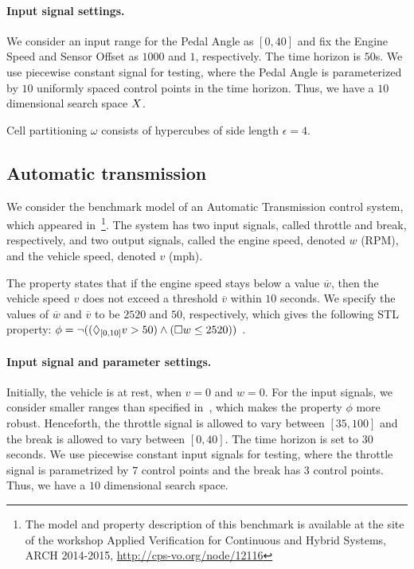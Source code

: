 \paragraph{Input signal settings.}
We consider an input range for
the Pedal Angle as $[0,40]$ and fix the Engine Speed and
Sensor Offset as $1000$ and $1$, respectively. The time horizon is $50$s.  We use piecewise constant
signal for testing, where the Pedal Angle is parameterized by $10$
uniformly spaced control points in the time horizon.  Thus, we
have a $10$ dimensional search space $X$.%



Cell partitioning $\omega$
consists of hypercubes of side length $\epsilon=4$. 


\subsection{Automatic transmission} \label{sec:autotrans}
We consider the benchmark model of an Automatic Transmission control
system, which appeared in~\cite{DBLP:conf/cpsweek/HoxhaAF14}\footnote{The model
and property description of this benchmark is available at the site of
the workshop Applied Verification for Continuous and Hybrid Systems,
ARCH 2014-2015, \url{http://cps-vo.org/node/12116}}.  The system has
two input signals, called throttle and break, respectively, and two
output signals, called the engine speed, denoted $w$ (RPM), and the vehicle
speed, denoted $v$ (mph).%

The property states that if the engine speed stays below a value
$\overline{w}$, then the vehicle speed $v$ does not exceed a threshold
$\overline{v}$ within $10$ seconds.  We specify the values of $\overline{w}$ and
$\overline{v}$ to be $2520$ and $50$, respectively, which gives the
following STL property: $\phi=\neg ((\Diamond_{[0,10]}v>50)\wedge(\Box w\leq
2520) )$ \cite{DBLP:conf/cpsweek/HoxhaAF14}.

\paragraph{Input signal and parameter settings.}
Initially, the vehicle is at rest, when $v=0$ and $w=0$.  For the
input signals, we consider smaller ranges than specified
in~\cite{DBLP:conf/cpsweek/HoxhaAF14}, which makes the property $\phi$ more
robust.  Henceforth, the throttle signal is allowed to vary between
$[35,100]$ and the break is allowed to vary between $[0,40]$.  The
time horizon is set to $30$ seconds.  We use piecewise constant input
signals for testing, where the throttle signal is parametrized by $7$
control points and the break has $3$ control points. Thus, we have a
$10$ dimensional search space.


